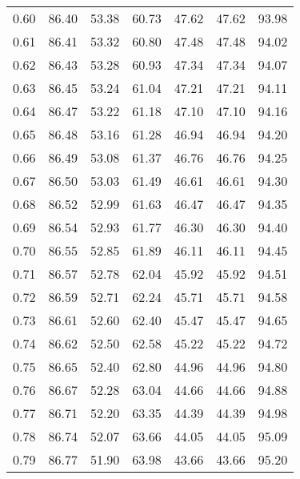 \begin{tabular}{|c|c|c|c|c|c|c|}
      0.60 &     86.40 &     53.38 &      60.73 &   47.62 &      47.62 &         93.98 \\
      0.61 &     86.41 &     53.32 &      60.80 &   47.48 &      47.48 &         94.02 \\
      0.62 &     86.43 &     53.28 &      60.93 &   47.34 &      47.34 &         94.07 \\
      0.63 &     86.45 &     53.24 &      61.04 &   47.21 &      47.21 &         94.11 \\
      0.64 &     86.47 &     53.22 &      61.18 &   47.10 &      47.10 &         94.16 \\
      0.65 &     86.48 &     53.16 &      61.28 &   46.94 &      46.94 &         94.20 \\
      0.66 &     86.49 &     53.08 &      61.37 &   46.76 &      46.76 &         94.25 \\
      0.67 &     86.50 &     53.03 &      61.49 &   46.61 &      46.61 &         94.30 \\
      0.68 &     86.52 &     52.99 &      61.63 &   46.47 &      46.47 &         94.35 \\
      0.69 &     86.54 &     52.93 &      61.77 &   46.30 &      46.30 &         94.40 \\
      0.70 &     86.55 &     52.85 &      61.89 &   46.11 &      46.11 &         94.45 \\
      0.71 &     86.57 &     52.78 &      62.04 &   45.92 &      45.92 &         94.51 \\
      0.72 &     86.59 &     52.71 &      62.24 &   45.71 &      45.71 &         94.58 \\
      0.73 &     86.61 &     52.60 &      62.40 &   45.47 &      45.47 &         94.65 \\
      0.74 &     86.62 &     52.50 &      62.58 &   45.22 &      45.22 &         94.72 \\
      0.75 &     86.65 &     52.40 &      62.80 &   44.96 &      44.96 &         94.80 \\
      0.76 &     86.67 &     52.28 &      63.04 &   44.66 &      44.66 &         94.88 \\
      0.77 &     86.71 &     52.20 &      63.35 &   44.39 &      44.39 &         94.98 \\
      0.78 &     86.74 &     52.07 &      63.66 &   44.05 &      44.05 &         95.09 \\
      0.79 &     86.77 &     51.90 &      63.98 &   43.66 &      43.66 &         95.20 \\

\end{tabular}
